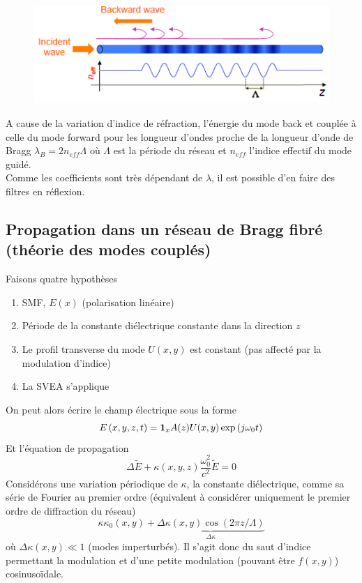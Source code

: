 	\begin{figure}
	\vspace{-5mm}
	\includegraphics[scale=0.6]{ch3/image10}
	\end{figure}
A cause de la variation d'indice de réfraction, l'énergie du mode back et couplée à celle du mode
forward pour les longueur d'ondes proche de la longueur d'onde de Bragg $\lambda_B = 2n_{eff}\Lambda$
où $\Lambda$ est la période du réseau et $n_{eff}$ l'indice effectif du mode guidé. \\

Comme les coefficients sont très dépendant de $\lambda$, il est possible d'en faire des filtres
en réflexion.




\newpage
\subsection{Propagation dans un réseau de Bragg fibré (théorie des modes couplés)}
Faisons quatre  hypothèses
\begin{enumerate}
\item SMF, $E(x)$ (polarisation linéaire)
\item Période de la constante diélectrique constante dans la direction $z$
\item Le profil transverse du mode $U(x,y)$ est constant (pas affecté par la modulation d'indice)
\item La SVEA s'applique
\end{enumerate}
On peut alors écrire le champ électrique sous la forme
\begin{equation}
E\left( {x,y,z,t} \right) = {{\bf{1}}_x}A(z)U(x,y)\exp \left( {j{\omega _0}t} \right)
\end{equation}
Et l'équation de propagation
\begin{equation}
\Delta {\tilde  E + }\kappa (x,y,z)\frac{{\omega _0^2}}{{{c^2}}}\tilde E = 0
\end{equation}
Considérons une variation périodique de $\kappa$, la constante diélectrique, comme sa série de
Fourier au premier ordre (équivalent à considérer uniquement le premier ordre de diffraction 
du réseau)
\begin{equation}
\kappa {\kappa _0}(x,y) + \underbrace{\Delta \kappa (x,y)\cos (2\pi z/\Lambda )}_{\Delta \kappa}
\end{equation}
où $\Delta\kappa(x,y)\ll 1$ (modes imperturbés). Il s'agit donc du saut d'indice permettant la 
modulation et d'une petite modulation (pouvant être $f(x,y)$) cosinusoïdale. \\


